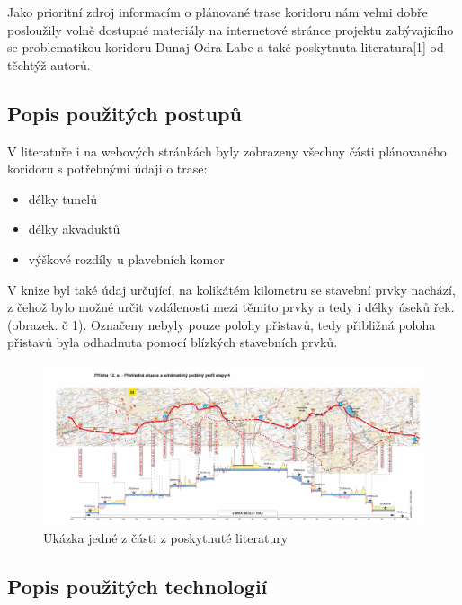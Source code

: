 \documentclass[11pt,a4paper]{article}
\begin{document}
    Jako prioritní zdroj informacím o plánované trase koridoru 
    nám velmi dobře posloužily volně
    dostupné materiály na internetové stránce projektu zabývajicího se
    problematikou koridoru Dunaj-Odra-Labe a také poskytnuta literatura[1] od
    těchtýž autorů.

    \subsection{Popis použitých postupů}

      V literatuře i na webových stránkách byly zobrazeny všechny části
      plánovaného koridoru s potřebnými údaji o trase:
      \begin{itemize}
        \item délky tunelů
        \item délky akvaduktů
        \item výškové rozdíly u plavebních komor
      \end{itemize}

      V knize byl také údaj určující, na kolikátém kilometru se stavební prvky
      nachází, z čehož bylo možné určit vzdálenosti mezi těmito prvky a tedy i
      délky úseků řek. (obrazek. č 1).  Označeny nebyly pouze polohy přistavů,
      tedy přibližná poloha přistavů byla odhadnuta pomocí blízkých stavebních
      prvků.

    \begin{figure}[ht!]
      \centering
      \includegraphics[width=1\textwidth, natwidth=6969, natheight=2953]
                      {etapa4.jpg}
      \caption{Ukázka jedné z části z poskytnuté literatury \label{overflow}}
    \end{figure}

    \subsection{Popis použitých technologií}
\end{document}
